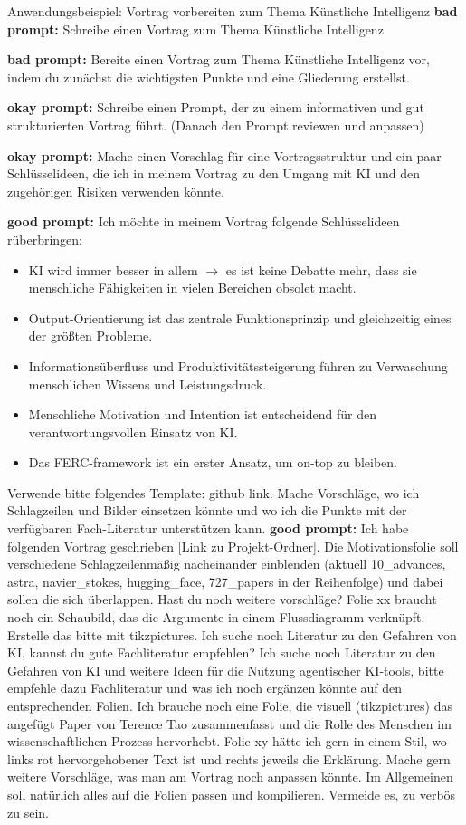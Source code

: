 \documentclass[aspectratio=\BeamerAspectRatio]{beamer}
\begin{document}
\begin{frame}{Anwendungsbeispiel: Vortrag vorbereiten zum Thema Künstliche Intelligenz}
\textbf{bad prompt:} Schreibe einen Vortrag zum Thema Künstliche Intelligenz

\textbf{bad prompt:} Bereite einen Vortrag zum Thema Künstliche Intelligenz vor, indem du zunächst die wichtigsten Punkte und eine Gliederung erstellst.

\textbf{okay prompt:} Schreibe einen Prompt, der zu einem informativen und gut strukturierten Vortrag führt. (Danach den Prompt reviewen und anpassen)

\textbf{okay prompt:} Mache einen Vorschlag für eine Vortragsstruktur und ein paar Schlüsselideen, die ich in meinem Vortrag zu den Umgang mit KI und den zugehörigen Risiken verwenden könnte.

\textbf{good prompt:} Ich möchte in meinem Vortrag folgende Schlüsselideen rüberbringen:
\begin{itemize}
\item KI wird immer besser in allem $\to$ es ist keine Debatte mehr, dass sie menschliche Fähigkeiten in vielen Bereichen obsolet macht.
\item Output-Orientierung ist das zentrale Funktionsprinzip und gleichzeitig eines der größten Probleme.
\item Informationsüberfluss und Produktivitätssteigerung führen zu Verwaschung menschlichen Wissens und Leistungsdruck.
\item Menschliche Motivation und Intention ist entscheidend für den verantwortungsvollen Einsatz von KI.
\item Das FERC-framework ist ein erster Ansatz, um \glqq on-top \grqq zu bleiben.
\end{itemize}
Verwende bitte folgendes Template: github link. Mache Vorschläge, wo ich Schlagzeilen und Bilder einsetzen könnte und wo ich die Punkte mit der verfügbaren Fach-Literatur unterstützen kann. 
\textbf{good prompt:} Ich habe folgenden Vortrag geschrieben [Link zu Projekt-Ordner]. Die Motivationsfolie soll verschiedene Schlagzeilenmäßig nacheinander einblenden (aktuell 10_advances, astra, navier_stokes, hugging_face, 727_papers in der Reihenfolge) und dabei sollen die sich überlappen. Hast du noch weitere vorschläge? Folie xx braucht noch ein Schaubild, das die Argumente in einem Flussdiagramm verknüpft. Erstelle das bitte mit tikzpictures. Ich suche noch Literatur zu den Gefahren von KI, kannst du gute Fachliteratur empfehlen? 
Ich suche noch Literatur zu den Gefahren von KI und weitere Ideen für die Nutzung agentischer KI-tools, bitte empfehle dazu Fachliteratur und was ich noch ergänzen könnte auf den entsprechenden Folien. Ich brauche noch eine Folie, die visuell (tikzpictures) das angefügt Paper von Terence Tao zusammenfasst und die Rolle des Menschen im wissenschaftlichen Prozess hervorhebt. Folie xy hätte ich gern in einem Stil, wo links rot hervorgehobener Text ist und rechts jeweils die Erklärung. Mache gern weitere Vorschläge, was man am Vortrag noch anpassen könnte. Im Allgemeinen soll natürlich alles auf die Folien passen und kompilieren. Vermeide es, zu verbös zu sein.

\end{frame}
\end{document}

